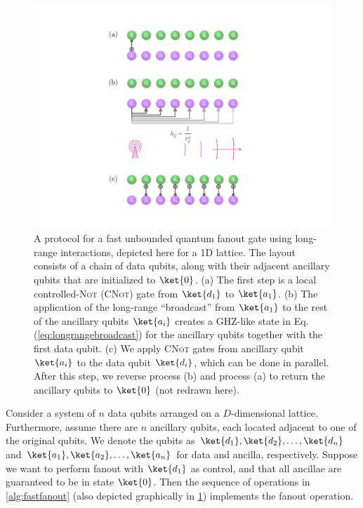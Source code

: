 \begin{figure}[t]
\centering
    \includegraphics[scale=0.45]{figures/fanoutgate.pdf}
\centering
  \caption{A protocol for a fast unbounded quantum fanout gate using long-range interactions, depicted here for a 1D lattice.
  The layout consists of a chain of data qubits, along with their adjacent ancillary qubits that are initialized to $\ket{0}$.
  (a) The first step is a local controlled-\textsc{Not} (\textsc{CNot}) gate from $\ket{d_1}$ to $\ket{a_1}$.
  (b) The application of the long-range ``broadcast'' from $\ket{a_1}$ to the rest of the ancillary qubits $\ket{a_i}$ creates a GHZ-like state in Eq.\,(\ref{eq:longrangebroadcast}) for the ancillary qubits together with the first data qubit.
  (c) We apply \textsc{CNot} gates from ancillary qubit $\ket{a_i}$ to the data qubit $\ket{d_i}$, which can be done in parallel. After this step, we reverse process (b) and process (a) to return the ancillary qubits to $\ket{0}$ (not redrawn here). }
  \label{fig:broadcast}
\end{figure}

Consider a system of $n$ data qubits arranged on a $D$-dimensional lattice.
Furthermore, assume there are $n$ ancillary qubits, each located adjacent to one of the original qubits.
We denote the qubits as $\ket{d_1}, \ket{d_2}, \dots, \ket{d_n}$ and $\ket{a_1}, \ket{a_2}, \dots, \ket{a_n}$ for data and ancilla, respectively.
Suppose we want to perform fanout with $\ket{d_1}$ as control, and that all ancillae are guaranteed to be in state $\ket{0}$.
Then the sequence of operations in \cref{alg:fastfanout} (also depicted graphically in \cref{fig:broadcast}) implements the fanout operation.

